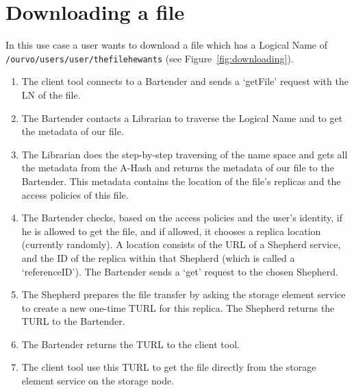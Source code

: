 \documentclass{book}
\begin{document}

\section{Downloading a file} %
\label{sec:downloading_a_file}
\begin{figure}[ht]
\end{figure}

In this use case a user wants to download a file which has a Logical Name of \verb#/ourvo/users/user/thefilehewants# (see Figure~\ref{fig:downloading}).

\begin{enumerate}
    \item The client tool connects to a Bartender and sends a `getFile' request with the LN of the file.
    \item The Bartender contacts a Librarian to traverse the Logical Name and to get the metadata of our file.
    \item The Librarian does the step-by-step traversing of the name space and gets all the metadata from the A-Hash and returns the metadata of our file to the Bartender. This metadata contains the location of the file's replicas and the access policies of this file.
    \item The Bartender checks, based on the access policies and the user's identity, if he is allowed to get the file, and if allowed, it chooses a replica location (currently randomly). A location consists of the URL of a Shepherd service, and the ID of the replica within that Shepherd (which is called a `referenceID'). The Bartender sends a `get' request to the chosen Shepherd.
    \item The Shepherd prepares the file transfer by asking the storage element service to create a new one-time TURL for this replica. The Shepherd returns the TURL to the Bartender.
    \item The Bartender returns the TURL to the client tool.
    \item The client tool use this TURL to get the file directly from the storage element service on the storage node.
\end{enumerate}
\end{document}

